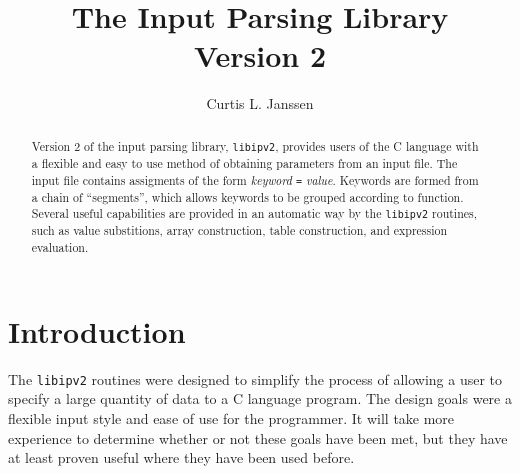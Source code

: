 
%
%


\title{The Input Parsing Library \\ Version 2}
\author{Curtis L. Janssen}



\newcommand{\libip}{{\tt libipv2}}
\newcommand{\sgen}{{\tt sgen}}
\newcommand{\var}[1]{{\it #1}}
\newcommand{\lit}[1]{{\tt #1}}
\newcommand{\clang}[1]{{\tt #1}}

\maketitle

\begin{abstract}
Version 2 of the input parsing library, \libip{},
provides users of the C language with a flexible and easy to
use method of obtaining parameters from an input file.
The input file contains assigments of the form \var{keyword} \lit{=}
\var{value}.
Keywords are formed from a chain of ``segments'', which allows keywords
to be grouped according to function.
Several useful capabilities are provided in an automatic way by the
\libip{} routines, such as value substitions, array construction,
table construction, and expression evaluation.
\end{abstract}

\vskip 0.25in
{
\centering
{}
\vskip 0.25in
}

\tableofcontents


\section{Introduction}
The \libip{} routines were designed to simplify the process of allowing
a user to specify a large quantity of data to a C language program.
The design goals were a flexible input style and ease of use for the
programmer.  It will take more experience to determine whether or
not these goals have been met, but they have at least proven useful where
they have been used before.

